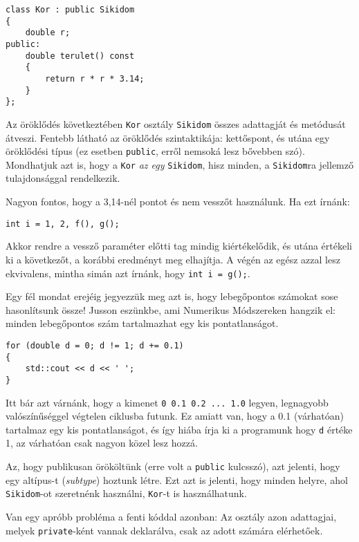 \documentclass[a4paper,11.5pt,table]{article}
\begin{document}
	\begin{lstlisting}
class Kor : public Sikidom
{
	double r;
public:
	double terulet() const
	{
		return r * r * 3.14;
	}
};
	\end{lstlisting}
	Az öröklődés következtében \texttt{Kor} osztály \texttt{Sikidom} összes adattagját és metódusát átveszi. Fentebb látható az öröklődés szintaktikája: kettőspont, és utána egy öröklődési típus (ez esetben \texttt{public}, erről nemsoká lesz bővebben szó). Mondhatjuk azt is, hogy a \texttt{Kor} \textit{az egy} \texttt{Sikidom}, hisz minden, a \texttt{Sikidom}ra jellemző tulajdonsággal rendelkezik.
	\begin{note}
		Nagyon fontos, hogy a 3,14-nél pontot és nem vesszőt használunk. Ha ezt írnánk:
		\begin{lstlisting}
int i = 1, 2, f(), g();
		\end{lstlisting}
		
		Akkor rendre a vessző paraméter előtti tag mindig kiértékelődik, és utána értékeli ki a következőt, a korábbi eredményt meg elhajítja. A végén az egész azzal lesz ekvivalens, mintha simán azt írnánk, hogy \texttt{int i = g();}.
		
		Egy fél mondat erejéig jegyezzük meg azt is, hogy lebegőpontos számokat sose hasonlítsunk össze! Jusson eszünkbe, ami Numerikus Módszereken hangzik el: minden lebegőpontos szám tartalmazhat egy kis pontatlanságot.
		\begin{lstlisting}
for (double d = 0; d != 1; d += 0.1)
{
	std::cout << d << ' ';
}
		\end{lstlisting}
		Itt bár azt várnánk, hogy a kimenet \texttt{0 0.1 0.2 ... 1.0} legyen, legnagyobb valószínűséggel végtelen ciklusba futunk. Ez amiatt van, hogy a 0.1 (várhatóan) tartalmaz egy kis pontatlanságot, és így hiába írja ki  a programunk hogy \texttt{d} értéke 1, az várhatóan csak nagyon közel lesz hozzá.
	\end{note}
	Az, hogy publikusan örököltünk (erre volt a \texttt{public} kulcsszó), azt jelenti, hogy egy {altípus}-t (\textit{subtype}) hoztunk létre. 
	Ezt azt is jelenti, hogy minden helyre, ahol \texttt{Sikidom}-ot szeretnénk használni, \texttt{Kor}-t is használhatunk.
	
	Van egy apróbb probléma a fenti kóddal azonban: Az osztály azon adattagjai, melyek \texttt{private}-ként vannak deklarálva, csak az adott számára elérhetőek.
	
\end{document}
